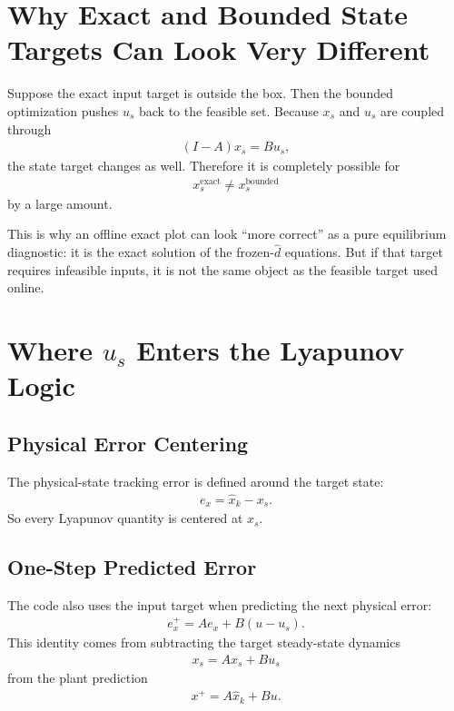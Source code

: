 \documentclass[11pt]{article}
\begin{document}
\section{Why Exact and Bounded State Targets Can Look Very Different}

Suppose the exact input target is outside the box. Then the bounded optimization pushes $u_s$ back to the feasible set. Because $x_s$ and $u_s$ are coupled through
\begin{align}
(I-A)x_s = Bu_s,
\end{align}
the state target changes as well. Therefore it is completely possible for
\begin{align}
x_s^{\mathrm{exact}} \neq x_s^{\mathrm{bounded}}
\end{align}
by a large amount.

This is why an offline exact plot can look ``more correct'' as a pure equilibrium diagnostic: it is the exact solution of the frozen-$\hat d$ equations. But if that target requires infeasible inputs, it is not the same object as the feasible target used online.

\section{Where \texorpdfstring{$u_s$}{u\_s} Enters the Lyapunov Logic}

\subsection{Physical Error Centering}

The physical-state tracking error is defined around the target state:
\begin{align}
e_x = \hat x_k - x_s.
\end{align}
So every Lyapunov quantity is centered at $x_s$.

\subsection{One-Step Predicted Error}

The code also uses the input target when predicting the next physical error:
\begin{align}
e_x^+ = A e_x + B(u-u_s).
\end{align}
This identity comes from subtracting the target steady-state dynamics
\begin{align}
x_s = Ax_s + Bu_s
\end{align}
from the plant prediction
\begin{align}
x^+ = A\hat x_k + Bu.
\end{align}
\end{document}

